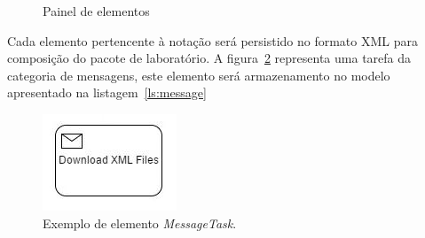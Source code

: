 \begin{figure}[!htb]
\centering
{}\qquad\qquad
{}
\caption{Painel de elementos}
\label{elementos}
\end{figure}




Cada elemento pertencente à notação será persistido no formato XML para composição do pacote de laboratório. A figura~\ref{mensagem} representa uma tarefa da categoria de mensagens, este elemento será armazenamento no modelo apresentado na listagem~\ref{ls:message}

\begin{figure}[!htb]
\centering
\includegraphics[scale=0.75]{images/mensagem.jpg}
\caption{Exemplo de elemento \textit{MessageTask}.}
\label{mensagem}
\end{figure}


